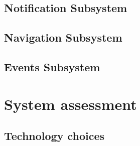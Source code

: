 \documentclass{article}
\begin{document}
		\subsection{Notification Subsystem}
	
		\subsection{Navigation Subsystem}
	
		\subsection{Events Subsystem}
	
	\pagebreak
	
	\section{System assessment}	
	
		\subsection{Technology choices}
\end{document}
